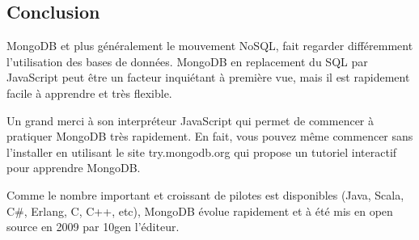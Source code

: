 \subsection{Conclusion}

MongoDB et plus généralement le mouvement NoSQL, fait regarder différemment l’utilisation des bases de données. MongoDB en replacement du SQL par JavaScript peut être un facteur inquiétant à première vue, mais il est rapidement facile à apprendre et très flexible.

Un grand merci à son interpréteur JavaScript qui permet de commencer à pratiquer MongoDB très rapidement.  En fait, vous pouvez même commencer sans l’installer en utilisant le site try.mongodb.org qui propose un tutoriel interactif pour apprendre MongoDB.

Comme le nombre important et croissant de pilotes est disponibles (Java, Scala, C\#, Erlang, C, C++, etc), MongoDB évolue rapidement et à été mis en open source en 2009 par 10gen l’éditeur.




